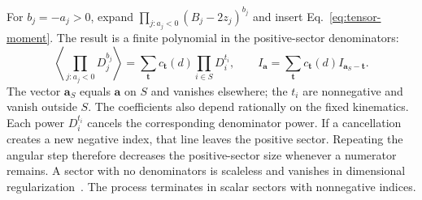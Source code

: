 For $b_j=-a_j>0$, expand $\prod_{j:a_j<0}(B_j-2z_j)^{b_j}$ and insert Eq.~\eqref{eq:tensor-moment}. The result is a finite polynomial in the positive-sector denominators:
\begin{equation}
 \left\langle\prod_{j:a_j<0}D_j^{b_j}\right\rangle
 =\sum_{\boldsymbol t}c_{\boldsymbol t}(d)\prod_{i\in S}D_i^{t_i},
 \qquad
 I_{\boldsymbol a}=\sum_{\boldsymbol t}c_{\boldsymbol t}(d)
 I_{\boldsymbol a_S-\boldsymbol t}.
 \label{eq:tensor-expansion}
\end{equation}
The vector $\boldsymbol a_S$ equals $\boldsymbol a$ on $S$ and vanishes elsewhere; the $t_i$ are nonnegative and vanish outside $S$. The coefficients also depend rationally on the fixed kinematics. Each power $D_i^{t_i}$ cancels the corresponding denominator power. If a cancellation creates a new negative index, that line leaves the positive sector. Repeating the angular step therefore decreases the positive-sector size whenever a numerator remains. A sector with no denominators is scaleless and vanishes in dimensional regularization~\cite{Weinzierl2022}. The process terminates in scalar sectors with nonnegative indices.

